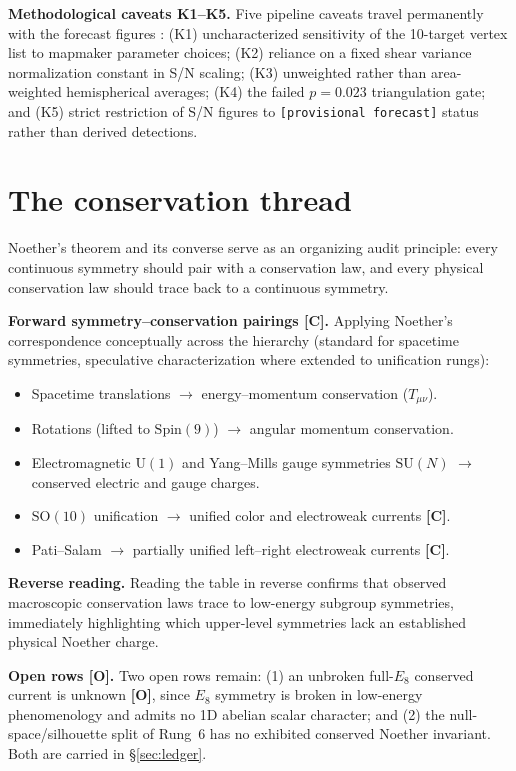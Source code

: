 \documentclass[11pt]{article}
\begin{document}
\noindent\textbf{Methodological caveats K1--K5.} Five pipeline caveats travel permanently with the forecast figures \cite{predictions-paper}: (K1) uncharacterized sensitivity of the 10-target vertex list to mapmaker parameter choices; (K2) reliance on a fixed shear variance normalization constant in S/N scaling; (K3) unweighted rather than area-weighted hemispherical averages; (K4) the failed $p=0.023$ triangulation gate; and (K5) strict restriction of S/N figures to \texttt{[provisional forecast]} status rather than derived detections.

\section{The conservation thread}
\label{sec:noether}
Noether's theorem and its converse serve as an organizing audit principle: every continuous symmetry should pair with a conservation law, and every physical conservation law should trace back to a continuous symmetry.

\noindent\textbf{Forward symmetry--conservation pairings [C].} Applying Noether's correspondence conceptually across the hierarchy (standard for spacetime symmetries, speculative characterization where extended to unification rungs):
\begin{itemize}
\item Spacetime translations $\to$ energy--momentum conservation ($T_{\mu\nu}$).
\item Rotations (lifted to $\mathrm{Spin}(9)$) $\to$ angular momentum conservation.
\item Electromagnetic $\mathrm{U}(1)$ and Yang--Mills gauge symmetries $\mathrm{SU}(N)$ $\to$ conserved electric and gauge charges.
\item $\mathrm{SO}(10)$ unification $\to$ unified color and electroweak currents \textbf{[C]}.
\item Pati--Salam $\to$ partially unified left--right electroweak currents \textbf{[C]}.
\end{itemize}

\noindent\textbf{Reverse reading.} Reading the table in reverse confirms that observed macroscopic conservation laws trace to low-energy subgroup symmetries, immediately highlighting which upper-level symmetries lack an established physical Noether charge.

\noindent\textbf{Open rows [O].} Two open rows remain: (1) an unbroken full-$E_8$ conserved current is unknown \textbf{[O]}, since $E_8$ symmetry is broken in low-energy phenomenology and admits no 1D abelian scalar character; and (2) the null-space/silhouette split of Rung~6 has no exhibited conserved Noether invariant. Both are carried in \S\ref{sec:ledger}.
\end{document}
